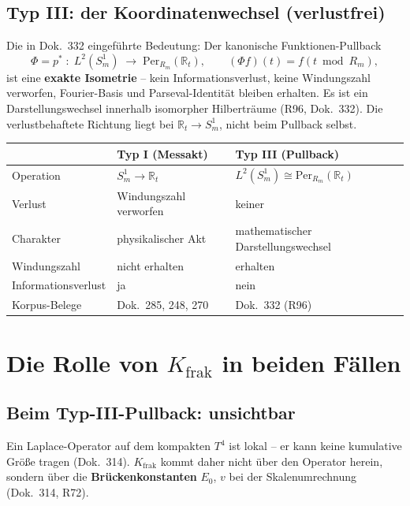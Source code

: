 \subsection{Typ III: der Koordinatenwechsel (verlustfrei)}

Die in Dok.~332 eingeführte Bedeutung: Der kanonische
Funktionen-Pullback
\[
  \Phi = p^* \;:\; L^2(S^1_m) \;\longrightarrow\;
  \mathrm{Per}_{R_m}(\mathbb{R}_t), \qquad
  (\Phi f)(t) = f(t \bmod R_m),
\]
ist eine \textbf{exakte Isometrie} -- kein Informationsverlust, keine
Windungszahl verworfen, Fourier-Basis und Parseval-Identität bleiben
erhalten. Es ist ein Darstellungswechsel innerhalb isomorpher
Hilberträume (R96, Dok.~332). Die verlustbehaftete Richtung liegt
bei $\mathbb{R}_t\to S^1_m$, nicht beim Pullback selbst.

\begin{center}
\begin{tabular}{lp{4.5cm}p{4.5cm}}
\toprule
 & \textbf{Typ I (Messakt)} & \textbf{Typ III (Pullback)} \\
\midrule
Operation & $S^1_m\to\mathbb{R}_t$ & $L^2(S^1_m)\cong\mathrm{Per}_{R_m}(\mathbb{R}_t)$ \\
Verlust & Windungszahl verworfen & keiner \\
Charakter & physikalischer Akt & mathematischer Darstellungswechsel \\
Windungszahl & nicht erhalten & erhalten \\
Informationsverlust & ja & nein \\
Korpus-Belege & Dok.~285, 248, 270 & Dok.~332 (R96) \\
\bottomrule
\end{tabular}
\end{center}

\section{Die Rolle von $K_{\text{frak}}$ in beiden Fällen}

\subsection{Beim Typ-III-Pullback: unsichtbar}

Ein Laplace-Operator auf dem kompakten $T^4$ ist lokal -- er kann
keine kumulative Größe tragen (Dok.~314). $K_{\text{frak}}$ kommt
daher nicht über den Operator herein, sondern über die
\textbf{Brückenkonstanten} $E_0$, $v$ bei der Skalenumrechnung
(Dok.~314, R72).

